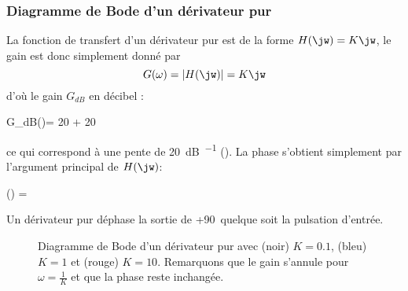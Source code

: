 \subsubsection{Diagramme de Bode d'un dérivateur pur}
La fonction de transfert d'un dérivateur pur est de la forme $H(\jw)=K\jw$,
le gain est donc simplement donné par 
\[
G(\omega)=|H(\jw)|=K\jw
\] 
d'où le gain $G_{dB}$ en décibel :
\begin{bequation}
    G_{dB}(\omega)= 20 + 20\log{\omega}
\end{bequation}
ce qui correspond à une pente de \SI{+20}{\dB\per\dec} ().
La phase s'obtient simplement par l'argument principal de $H(\jw)$:
\begin{bequation}
    \phi(\omega) = 
\end{bequation}
Un dérivateur pur déphase la sortie de +90\degreeSI~quelque soit la pulsation 
d'entrée.
\begin{figure}[!htb]
    \centering
    

    
    \caption{Diagramme de Bode d'un dérivateur pur 
             avec (noir) $K=0.1$, (bleu) $K=1$ et (rouge) $K=10$. Remarquons 
             que le gain s'annule pour $\omega=\frac{1}{K}$ et que la phase 
             reste inchangée.\label{fig-bode_deriv}}
\end{figure}
\newpage
